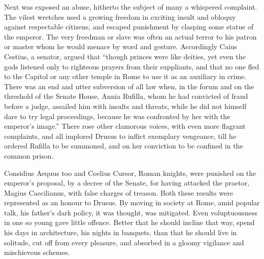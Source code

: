 
Next was exposed an abuse, hitherto the subject of many a whispered complaint. The vilest wretches used a growing freedom in exciting insult and obloquy against respectable citizens, and escaped punishment by clasping some statue of the emperor. The very freedman or slave was often an actual terror to his patron or master whom he would menace by word and gesture. Accordingly Caius Cestius, a senator, argued that ``though princes were like deities, yet even the gods listened only to righteous prayers from their suppliants, and that no one fled to the Capitol or any other temple in Rome to use it as an auxiliary in crime. There was an end and utter subversion of all law when, in the forum and on the threshold of the Senate House, Annia Rufilla, whom he had convicted of fraud before a judge, assailed him with insults and threats, while he did not himself dare to try legal proceedings, because he was confronted by her with the emperor's image.'' There rose other clamorous voices, with even more flagrant complaints, and all implored Drusus to inflict exemplary vengeance, till he ordered Rufilla to be summoned, and on her conviction to be confined in the common prison.


Considius Aequus too and Coelius Cursor, Roman knights, were punished on the emperor's proposal, by a decree of the Senate, for having attacked the praetor, Magius Caecilianus, with false charges of treason. Both these results were represented as an honour to Drusus. By moving in society at Rome, amid popular talk, his father's dark policy, it was thought, was mitigated. Even voluptuousness in one so young gave little offence. Better that he should incline that way, spend his days in architecture, his nights in banquets, than that he should live in solitude, cut off from every pleasure, and absorbed in a gloomy vigilance and mischievous schemes.


